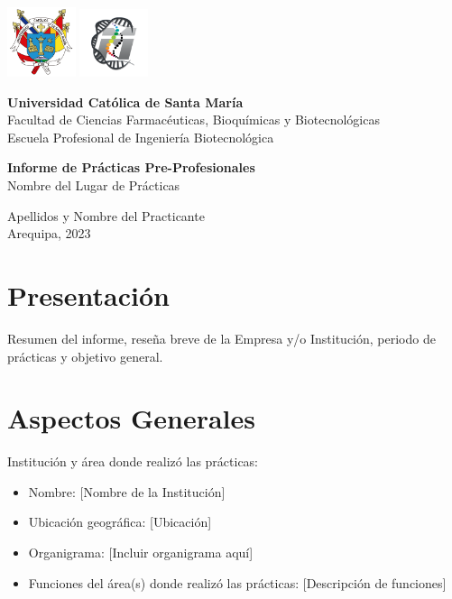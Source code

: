 \documentclass[a4paper]{article}
\begin{document}
\begin{titlepage}
  \begin{center}
    \includegraphics[width=2cm]{Img/Escudo-UCSM.png}\hfill
    \includegraphics[width=2cm]{Img/ciim.png}\par
    \vspace{1cm}
    \textbf{Universidad Católica de Santa María}\\
    Facultad de Ciencias Farmacéuticas, Bioquímicas y Biotecnológicas\\
    Escuela Profesional de Ingeniería Biotecnológica\par
    \vfill
    \textbf{Informe de Prácticas Pre-Profesionales}\\
    Nombre del Lugar de Prácticas\par
    \vfill
    Apellidos y Nombre del Practicante\\
    Arequipa, 2023
  \end{center}
\end{titlepage}

\tableofcontents

\newpage

\section{Presentación}
Resumen del informe, reseña breve de la Empresa y/o Institución, periodo de prácticas y objetivo general.

\section{Aspectos Generales}
Institución y área donde realizó las prácticas:
\begin{itemize}
  \item Nombre: [Nombre de la Institución]
  \item Ubicación geográfica: [Ubicación]
  \item Organigrama: [Incluir organigrama aquí]
  \item Funciones del área(s) donde realizó las prácticas: [Descripción de funciones]
\end{itemize}
\end{document}
